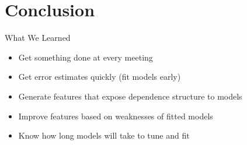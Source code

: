 \documentclass{beamer}
\begin{document}
\section{Conclusion} %

\begin{frame}{What We Learned}
  \begin{itemize}
    \item Get something done at every meeting
    \item Get error estimates quickly (fit models early)
    \item Generate features that expose dependence structure to models
    \item Improve features based on weaknesses of fitted models
    \item Know how long models will take to tune and fit
  \end{itemize}
\end{frame}
\end{document}
